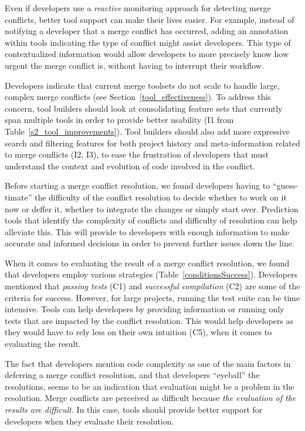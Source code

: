 Even if developers use a \emph{reactive} monitoring approach for detecting merge conflicts, better tool support can make their lives easier.
For example, instead of notifying a developer that a merge conflict has occurred, adding an annotation within tools indicating the type of conflict might assist developers.
This type of contextualized information would allow developers to more precisely know how urgent the merge conflict is, without having to interrupt their workflow.

Developers indicate that current merge toolsets do not scale to handle large, complex merge conflicts (see Section~\ref{tool_effectiveness}).
To address this concern, tool builders should look at consolidating feature sets that currently span multiple tools in order to provide better usability (I1 from Table~\ref{s2_tool_improvements}).
Tool builders should also add more expressive search and filtering features for both project history and meta-information related to merge conflicts (I2, I3), to ease the frustration of developers that must understand the context and evolution of code involved in the conflict.

Before starting a merge conflict resolution, we found developers having to ``guess-timate'' the difficulty of the conflict resolution to decide whether to work on it now or deffer it, whether to integrate the changes or simply start over. 
Prediction tools that identify the complexity of conflicts and difficulty of resolution can help alleviate this.
This will provide to developers with enough information to make accurate and informed decisions in order to prevent further issues down the line.

When it comes to evaluating the result of a merge conflict resolution, we found that developers employ various strategies (Table~\ref{conditionsSuccess}).
Developers mentioned that \textit{passing tests} (C1) and \textit{successful compilation} (C2) are some of the criteria for success.
However, for large projects, running the test suite can be time intensive.
Tools can help developers by providing information or running only tests that are impacted by the conflict resolution.
This would help developers as they would have to rely less on their own intuition (C5), when it comes to evaluating the result.

The fact that developers mention code complexity as one of the main factors in deferring a merge conflict resolution, and that developers ``eyeball'' the resolutions, seems to be an indication that evaluation might be a problem in the resolution.
Merge conflicts are perceived as difficult because \emph{the evaluation of the results are difficult.}
In this case, tools should provide better support for developers when they evaluate their resolution.

